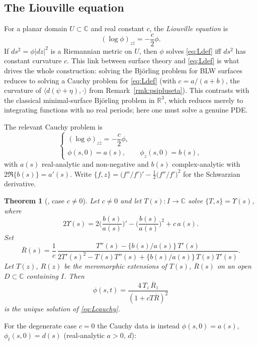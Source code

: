 \documentclass[11pt,a4paper]{article}
\newcommand{\RR}{\mathbb{R}}
\newcommand{\CC}{\mathbb{C}}
\newcommand{\ip}[2]{\langle #1,#2\rangle}            %
\theoremstyle{plain}
\newtheorem{theorem}{Theorem}
\theoremstyle{definition}
\theoremstyle{remark}
\begin{document}
\subsection{The Liouville equation}\label{ssec:Liouville}

For a planar domain $U\subset\CC$ and real constant $c$, the
\emph{Liouville equation} is
\begin{equation}\label{eq:Ldef}
  (\log\phi)_{z\bar z} = -\frac c2\phi.
\end{equation}
If $ds^2=\phi|dz|^2$ is a Riemannian metric on $U$, then $\phi$ solves
\eqref{eq:Ldef} iff $ds^2$ has constant curvature $c$. This link between
surface theory and \eqref{eq:Ldef} is what drives the whole construction:
solving the Björling problem for BLW surfaces reduces to solving a Cauchy
problem for \eqref{eq:Ldef} (with $c=a/(a+b)$, the curvature of
$\ip{d(\psi+\eta)}{\cdot}$ from Remark~\ref{rmk:psipluseta}). This
contrasts with the classical minimal-surface Björling problem in $\RR^3$,
which reduces merely to integrating functions with no real periods; here
one must solve a genuine PDE.

The relevant Cauchy problem is
\begin{equation}\label{eq:Lcauchy}
  \begin{cases}
    (\log\phi)_{z\bar z} = -\dfrac c2\phi,\\[1mm]
    \phi(s,0)=a(s), \qquad \phi_z(s,0)=b(s),
  \end{cases}
\end{equation}
with $a(s)$ real-analytic and non-negative and $b(s)$ complex-analytic
with $2\Re\{b(s)\}=a'(s)$. Write $\{f,z\}=\big(f''/f'\big)'-\tfrac12\big(f''/f'\big)^2$
for the Schwarzian derivative.

\begin{theorem}[{\cite[Thm.\,1]{GMM1}}, case $c\neq0$]\label{thm:GMM1-1}
Let $c\neq0$ and let $T(s):I\to\CC$ solve $\{T,s\}=\Upsilon(s)$, where
\[
  2\Upsilon(s)=2\Big(\frac{b(s)}{a(s)}\Big)'-\Big(\frac{b(s)}{a(s)}\Big)^2+c\,a(s).
\]
Set
\[
  \overline R(s)=\frac1c\,
    \frac{T''(s)-\{b(s)/a(s)\}\,T'(s)}
         {2T'(s)^2-T(s)T''(s)+\{b(s)/a(s)\}\,T(s)T'(s)}.
\]
Let $T(z)$, $R(z)$ be the meromorphic extensions of $T(s)$, $\overline R(s)$
on an open $D\subset\CC$ containing $I$. Then
\[
  \phi(s,t) = \frac{4\,T_z\,\overline R_{\bar z}}{(1+cT\overline R)^2}
\]
is the unique solution of \eqref{eq:Lcauchy}.
\end{theorem}

For the degenerate case $c=0$ the Cauchy data is instead
$\phi(s,0)=a(s)$, $\phi_t(s,0)=d(s)$ (real-analytic $a>0$, $d$):
\end{document}

